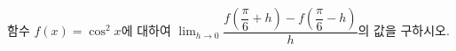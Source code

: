 함수 $f(x)=\cos^2 x$에 대하여 $\displaystyle\lim_{h\to 0}\dfrac{f\left(\dfrac{\pi}{6}+h\right)-f\left(\dfrac{\pi}{6}-h\right)}{h}$의 값을 구하시오.
